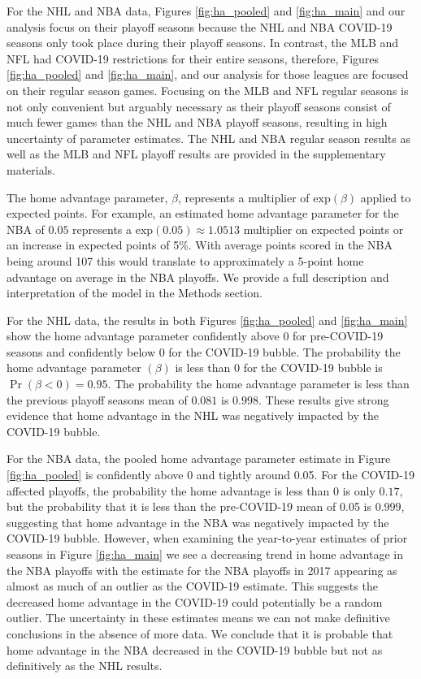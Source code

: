 For the NHL and NBA data, Figures \mbox{\ref{fig:ha_pooled}} and \mbox{\ref{fig:ha_main}} and our analysis focus on their playoff seasons because the NHL and NBA COVID-19 seasons only took place during their playoff seasons. In contrast, the MLB and NFL had COVID-19 restrictions for their entire seasons, therefore, Figures \mbox{\ref{fig:ha_pooled}} and \mbox{\ref{fig:ha_main}}, and our analysis for those leagues are focused on their regular season games. Focusing on the MLB and NFL regular seasons is not only convenient but arguably necessary as their playoff seasons consist of much fewer games than the NHL and NBA playoff seasons, resulting in high uncertainty of parameter estimates. The NHL and NBA regular season results as well as the MLB and NFL playoff results are provided in the supplementary materials.

The home advantage parameter, $\beta$, represents a multiplier of $\text{exp}(\beta)$ applied to expected points. For example, an estimated home advantage parameter for the NBA of $0.05$ represents a $\text{exp}(0.05) \approx 1.0513$ multiplier on expected points or an increase in expected points of 5\%. With average points scored in the NBA being around 107 this would translate to approximately a 5-point home advantage on average in the NBA playoffs. We provide a full description and interpretation of the model in the Methods section.

For the NHL data, the results in both Figures \mbox{\ref{fig:ha_pooled}} and \mbox{\ref{fig:ha_main}} show the home advantage parameter confidently above 0 for pre-COVID-19 seasons and confidently below 0 for the COVID-19 bubble. The probability the home advantage parameter $(\beta)$ is less than 0 for the COVID-19 bubble is $\Pr(\beta < 0) = 0.95$. The probability the home advantage parameter is less than the previous playoff seasons mean of $0.081$ is $0.998$. These results give strong evidence that home advantage in the NHL was negatively impacted by the COVID-19 bubble.

For the NBA data, the pooled home advantage parameter estimate in Figure \mbox{\ref{fig:ha_pooled}} is confidently above 0 and tightly around 0.05. For the COVID-19 affected playoffs, the probability the home advantage is less than 0 is only $0.17$, but the probability that it is less than the pre-COVID-19 mean of 0.05 is $0.999$, suggesting that home advantage in the NBA was negatively impacted by the COVID-19 bubble. However, when examining the year-to-year estimates of prior seasons in Figure \mbox{\ref{fig:ha_main}} we see a decreasing trend in home advantage in the NBA playoffs with the estimate for the NBA playoffs in 2017 appearing as almost as much of an outlier as the COVID-19 estimate. This suggests the decreased home advantage in the COVID-19 could potentially be a random outlier. The uncertainty in these estimates means we can not make definitive conclusions in the absence of more data. We conclude that it is probable that home advantage in the NBA decreased in the COVID-19 bubble but not as definitively as the NHL results.

